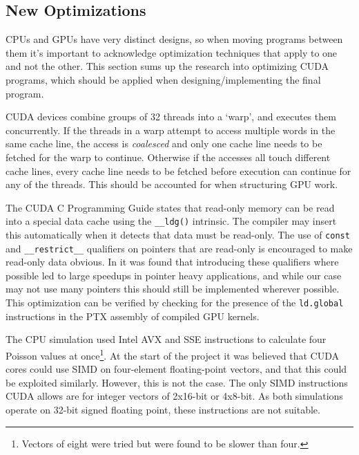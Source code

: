 \subsection{New Optimizations}
\label{sec:FutureOptimization}
CPUs and GPUs have very distinct designs, so when moving programs between them it's important to acknowledge optimization techniques that apply to one and not the other.
This section sums up the research into optimizing CUDA programs, which should be applied when designing/implementing the final program.

CUDA devices combine groups of 32 threads into a `warp', and executes them concurrently\cite{tool:CUDAProgrammingV1}.
If the threads in a warp attempt to access multiple words in the same cache line, the access is \textit{coalesced}\cite{NVIDIAHowBlog} and only one cache line needs to be fetched for the warp to continue.
Otherwise if the accesses all touch different cache lines, every cache line needs to be fetched before execution can continue for any of the threads.
This should be accounted for when structuring GPU work.

The CUDA C Programming Guide\cite{NVIDIAGlobalGuide} states that read-only memory can be read into a special data cache using the \texttt{\_\_ldg()} intrinsic.
The compiler may insert this automatically when it detects that data must be read-only.
The use of \texttt{const} and \texttt{\_\_restrict\_\_} qualifiers on pointers that are read-only is encouraged to make read-only data obvious.
In \cite{10.1145/3238147.3241533} it was found that introducing these qualifiers where possible led to large speedups in pointer heavy applications, and while our case may not use many pointers this should still be implemented wherever possible.
This optimization can be verified by checking for the presence of the \texttt{ld.global}\cite{NvidiaPTX} instructions in the PTX assembly of compiled GPU kernels.

The CPU simulation used Intel AVX and SSE instructions\cite{IntelCorporationIntroductionExtensions} to calculate four Poisson values at once\footnote{Vectors of eight were tried but were found to be slower than four.}.
At the start of the project it was believed that CUDA cores could use SIMD on four-element floating-point vectors, and that this could be exploited similarly.
However, this is not the case.
The only SIMD instructions CUDA allows are for integer vectors of 2x16-bit or 4x8-bit\cite{NvidiaCUDASIMD}.%
As both simulations operate on 32-bit signed floating point, these instructions are not suitable.

